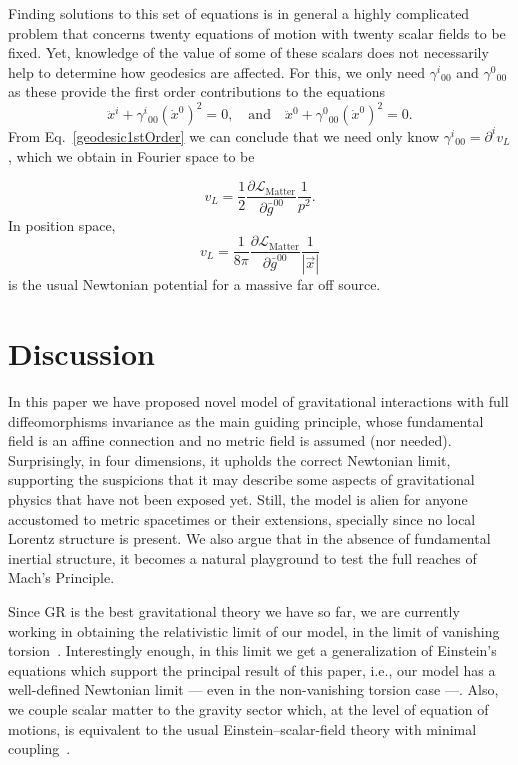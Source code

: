 \documentclass{ws-mpla}
\renewcommand{\(}{\left(}
\renewcommand{\)}{\right)}
\renewcommand{\[}{\left[}
\renewcommand{\]}{\right]}
\begin{document}
Finding solutions to this set of equations is in general a highly complicated problem that concerns twenty equations of motion with twenty scalar fields to be fixed. Yet, knowledge of the value of some of these scalars does not necessarily help to determine how geodesics are affected. For this, we only need $\gamma^i{}_{00}$ and $\gamma^0{}_{00}$ as these provide the first order contributions to the equations
\begin{equation}
  \label{geodesic1stOrder}
  \ddot{x}^i + \gamma^i{}_{00}(\dot{x}^0)^2 = 0,
  \quad \text{and} \quad
  \ddot{x}^0 + \gamma^0{}_{00}(\dot{x}^0)^2 = 0.
\end{equation}
From Eq.~\eqref{geodesic1stOrder} we can conclude that we need only know $\gamma^i{}_{00} = \partial^i v_L$, which we obtain in Fourier space to be

\begin{equation}
  v_L=\frac{1}{2}\frac{\partial\mathcal{L}_{\text{Matter}}}{\partial\bar{g}^{00}}\frac{1}{p^2}.
\end{equation}
In position space, 
\begin{equation}
  v_L = \frac{1}{8\pi} \frac{ \partial\mathcal{L}_{\text{Matter}} }{ \partial \bar{g}^{00} } \frac{1}{|\vec{x}|}
\end{equation}
is the usual Newtonian potential for a massive far off source.


\section{\label{sec:dis}Discussion}

In this paper we have proposed novel model of gravitational interactions with full diffeomorphisms invariance as the main guiding principle, whose fundamental field is an affine connection and no metric field is assumed (nor needed). Surprisingly, in four dimensions, it upholds the correct Newtonian limit, supporting the suspicions that it may describe some aspects of gravitational physics that have not been exposed yet. Still, the model is alien for anyone accustomed to metric spacetimes or their extensions, specially since no local Lorentz structure is present. We also argue that in the absence of fundamental inertial structure, it becomes a natural playground to test the full reaches of Mach's Principle.

Since GR is the best gravitational theory we have so far, we are currently working in obtaining the relativistic limit of our model, in the limit of vanishing torsion~\cite{OCF-future3}. Interestingly enough, in this limit we get a generalization of Einstein's equations which support the principal result of this paper, i.e., our model has a well-defined Newtonian limit --- even in the non-vanishing torsion case ---. Also, we couple scalar matter to the gravity sector which, at the level of equation of motions, is equivalent to the usual Einstein--scalar-field theory with minimal coupling~\cite{OCF-future3}.
\end{document}
